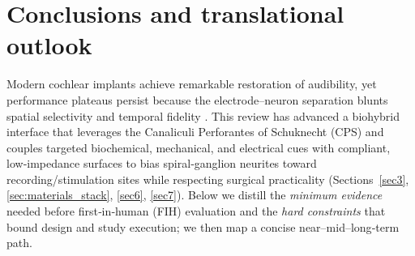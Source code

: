 \documentclass[referee,pdflatex, sn-vancouver-num]{sn-jnl}%
\theoremstyle{thmstyleone}%
\theoremstyle{thmstyletwo}%
\theoremstyle{thmstylethree}%
\begin{document}
\section{Conclusions and translational outlook}\label{sec:conclusion}
\noindent
Modern cochlear implants achieve remarkable restoration of audibility, yet performance plateaus persist because the electrode–neuron separation blunts spatial selectivity and temporal fidelity \cite{wilson2008,wilson2014,Micco2006}. This review has advanced a biohybrid interface that leverages the Canaliculi Perforantes of Schuknecht (CPS) and couples targeted biochemical, mechanical, and electrical cues with compliant, low‑impedance surfaces to bias spiral‑ganglion neurites toward recording/stimulation sites while respecting surgical practicality (Sections~\ref{sec3}, \ref{sec:materials_stack}, \ref{sec6}, \ref{sec7}). Below we distill the \emph{minimum evidence} needed before first‑in‑human (FIH) evaluation and the \emph{hard constraints} that bound design and study execution; we then map a concise near–mid–long‑term path.
\end{document}
